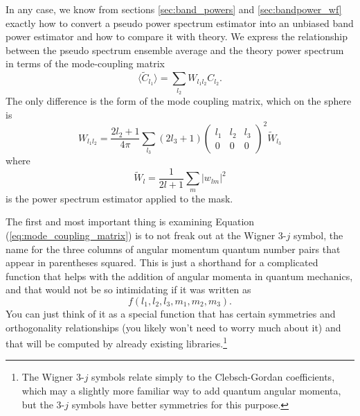 In any case, we know from sections \ref{sec:band_powers} and \ref{sec:bandpower_wf} exactly how to convert a pseudo power spectrum estimator into an unbiased band power estimator and how to compare it with theory.  We express the relationship between the pseudo spectrum ensemble average and the theory power spectrum in terms of the mode-coupling matrix
\begin{equation}
  \langle \tilde C_{l_1} \rangle = \sum_{l_2} W_{l_1 l_2} C_{l_2}. 
\end{equation}
The only difference is the form of the mode coupling matrix, which on the sphere is \citep{2002ApJ...567....2H}
\begin{equation}
  W_{l_1 l_2} = \frac{2l_2+1}{4\pi} \sum_{l_3} (2l_3 + 1) \left(
  \begin{array}{ccc}
    l_1 & l_2 & l_3 \\
    0 & 0 & 0
  \end{array}
    \right)^2  \tilde{W}_{l_3} \label{eq:mode_coupling_matrix}
\end{equation} 
where
\begin{equation}
   \tilde{W}_{l} = \frac{1}{2 l + 1} \sum_m | w_{l m} |^2
\end{equation}
is the power spectrum estimator applied to the mask.

The first and most important thing is examining Equation (\ref{eq:mode_coupling_matrix}) is to not freak out at the Wigner 3-$j$ symbol, the name for the three columns of angular momentum quantum number pairs that appear in parentheses squared.  This is just a shorthand for a complicated function that helps with the addition of angular momenta in quantum mechanics, and that would not be so intimidating if it was written as $$f(l_1,l_2,l_3,m_1,m_2,m_3).$$ You can just think of it as a special function that has certain symmetries and orthogonality relationships (you likely won't need to worry much about it) and that will be computed by already existing libraries.\footnote{The Wigner 3-$j$ symbols relate simply to the Clebsch-Gordan coefficients, which may a slightly more familiar way to add quantum angular momenta, but the 3-$j$ symbols have better symmetries for this purpose.}

